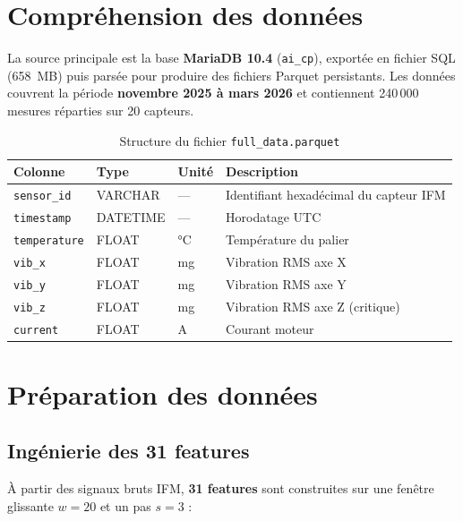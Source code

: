 \documentclass[12pt,a4paper]{report}
\begin{document}
\section{Compréhension des données}

La source principale est la base \textbf{MariaDB 10.4} (\texttt{ai\_cp}), exportée en fichier SQL
(658~MB) puis parsée pour produire des fichiers Parquet persistants. Les données couvrent la période
\textbf{novembre 2025 à mars 2026} et contiennent 240\,000 mesures réparties sur 20 capteurs.

\begin{table}[h]
\centering
\caption{Structure du fichier \texttt{full\_data.parquet}}
\begin{tabular}{llll}
\toprule
\textbf{Colonne} & \textbf{Type} & \textbf{Unité} & \textbf{Description} \\
\midrule
\texttt{sensor\_id}    & VARCHAR  & —    & Identifiant hexadécimal du capteur IFM \\
\texttt{timestamp}     & DATETIME & —    & Horodatage UTC \\
\texttt{temperature}   & FLOAT    & °C   & Température du palier \\
\texttt{vib\_x}        & FLOAT    & mg   & Vibration RMS axe X \\
\texttt{vib\_y}        & FLOAT    & mg   & Vibration RMS axe Y \\
\texttt{vib\_z}        & FLOAT    & mg   & Vibration RMS axe Z (critique) \\
\texttt{current}       & FLOAT    & A    & Courant moteur \\
\bottomrule
\end{tabular}
\end{table}

\section{Préparation des données}

\subsection{Ingénierie des 31 features}

À partir des signaux bruts IFM, \textbf{31 features} sont construites sur une fenêtre glissante
$w = 20$ et un pas $s = 3$ :
\end{document}
